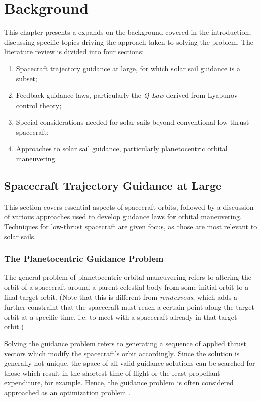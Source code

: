 \chapter{Background}
This chapter presents a expands on the background covered in the introduction, discussing specific topics driving the approach taken to solving the problem. The literature review is divided into four sections:
\begin{enumerate}
  \item Spacecraft trajectory guidance at large, for which solar sail guidance is a subset;
  \item Feedback guidance laws, particularly the \textit{Q-Law} derived from Lyapunov control theory;
  \item Special considerations needed for solar sails beyond conventional low-thrust spacecraft;
  \item Approaches to solar sail guidance, particularly planetocentric orbital maneuvering.
\end{enumerate}

\section{Spacecraft Trajectory Guidance at Large}

This section covers essential aspects of spacecraft orbits, followed by a discussion of various approaches used to develop guidance laws for orbital maneuvering. Techniques for low-thrust spacecraft are given focus, as those are most relevant to solar sails.

\subsection{The Planetocentric Guidance Problem}
The general problem of planetocentric orbital maneuvering refers to altering the orbit of a spacecraft around a parent celestial body from some initial orbit to a final target orbit. (Note that this is different from \textit{rendezvous}, which adds a further constraint that the spacecraft must reach a certain point along the target orbit at a specific time, i.e. to meet with a spacecraft already in that target orbit.)



Solving the guidance problem refers to generating a sequence of applied thrust vectors which modify the spacecraft's orbit accordingly. Since the solution is generally not unique, the space of all valid guidance solutions can be searched for those which result in the shortest time of flight or the least propellant expenditure, for example. Hence, the guidance problem is often considered approached as an optimization problem \cite{yam2011low}.

